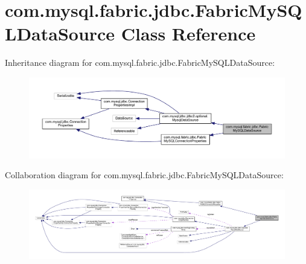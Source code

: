 \hypertarget{classcom_1_1mysql_1_1fabric_1_1jdbc_1_1_fabric_my_s_q_l_data_source}{}\section{com.\+mysql.\+fabric.\+jdbc.\+Fabric\+My\+S\+Q\+L\+Data\+Source Class Reference}
\label{classcom_1_1mysql_1_1fabric_1_1jdbc_1_1_fabric_my_s_q_l_data_source}


Inheritance diagram for com.\+mysql.\+fabric.\+jdbc.\+Fabric\+My\+S\+Q\+L\+Data\+Source\+:\nopagebreak
\begin{figure}[H]
\begin{center}
\leavevmode
\includegraphics[width=350pt]{classcom_1_1mysql_1_1fabric_1_1jdbc_1_1_fabric_my_s_q_l_data_source__inherit__graph}
\end{center}
\end{figure}


Collaboration diagram for com.\+mysql.\+fabric.\+jdbc.\+Fabric\+My\+S\+Q\+L\+Data\+Source\+:\nopagebreak
\begin{figure}[H]
\begin{center}
\leavevmode
\includegraphics[width=350pt]{classcom_1_1mysql_1_1fabric_1_1jdbc_1_1_fabric_my_s_q_l_data_source__coll__graph}
\end{center}
\end{figure}
